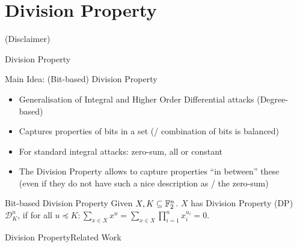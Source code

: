 \section{Division Property}
\begin{frame}[plain]
    \sectionpage
    \centering
    {\large
        (Disclaimer)
    }
    \vfill
\end{frame}

\begin{frame}{Division Property}
    \begin{block}{Main Idea: (Bit-based) Division Property}
        \begin{itemize}
            \item Generalisation of Integral and Higher Order Differential attacks \hfill (Degree-based)
            \item Captures properties of bits in a set \hfill (\eg/ combination of bits is balanced)
            \item For standard integral attacks: zero-sum, all or constant
            \item The Division Property allows to capture properties \enquote{in between} these\\
                  (even if they do not have such a nice description as \eg/ the zero-sum)
        \end{itemize}
    \end{block}
    \begin{block}{Bit-based Division Property}
        Given $X, K \subseteq \mathbb{F}_2^n$.
        $X$ has Division Property (DP) $\mathcal{D}^n_K$, if for all
        $\displaystyle u \preccurlyeq K: \sum_{x \in X} x^u = \sum_{x \in X} \prod_{i=1}^n x_i^{u_i} = 0$.
    \end{block}
\end{frame}

\begin{frame}{Division Property}{Related Work}
    \begin{timeline}
    \end{timeline}
\end{frame}

